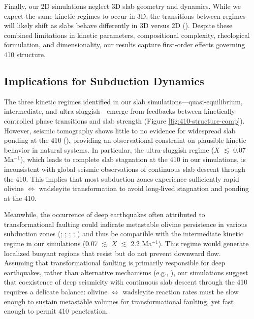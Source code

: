 \documentclass[
  paper=a4,
  ,captions=tableheading
]{scrartcl}
\begin{document}
Finally, our 2D simulations neglect 3D slab geometry and dynamics. While
we expect the same kinetic regimes to occur in 3D, the transitions
between regimes will likely shift as slabs behave differently in 3D
versus 2D (). Despite these
combined limitations in kinetic parameters, compositional complexity,
rheological formulation, and dimensionality, our results capture
first-order effects governing 410 structure.

\subsection{Implications for Subduction
Dynamics}\label{sec:implications-for-subduction-dynamics}

The three kinetic regimes identified in our slab
simulations---quasi-equilibrium, intermediate, and
ultra-sluggish---emerge from feedbacks between kinetically controlled
phase transitions and slab strength (Figure
\ref{fig:410-structure-comp}). However, seismic tomography shows little
to no evidence for widespread slab ponding at the 410
(), providing an
observational constraint on plausible kinetic behavior in natural
systems. In particular, the ultra-sluggish regime (\(\dot{X}\)
\(\lesssim\) 0.07 Ma\(^{-1}\)), which leads to complete slab stagnation
at the 410 in our simulations, is inconsistent with global seismic
observations of continuous slab descent through the 410. This implies
that most subduction zones experience sufficiently rapid olivine
\(\Leftrightarrow\) wadsleyite transformation to avoid long-lived
stagnation and ponding at the 410.

Meanwhile, the occurrence of deep earthquakes often attributed to
transformational faulting could indicate metastable olivine persistence
in various subduction zones (; ;
;
;
) and thus be
compatible with the intermediate kinetic regime in our simulations (0.07
\(\lesssim\) \(\dot{X}\) \(\lesssim\) 2.2 Ma\(^{-1}\)). This regime
would generate localized buoyant regions that resist but do not prevent
downward flow. Assuming that transformational faulting is primarily
responsible for deep earthquakes, rather than alternative mechanisms
(e.g., ), our simulations suggest
that coexistence of deep seismicity with continuous slab descent through
the 410 requires a delicate balance: olivine \(\Leftrightarrow\)
wadsleyite reaction rates must be slow enough to sustain metastable
volumes for transformational faulting, yet fast enough to permit 410
penetration.
\end{document}
